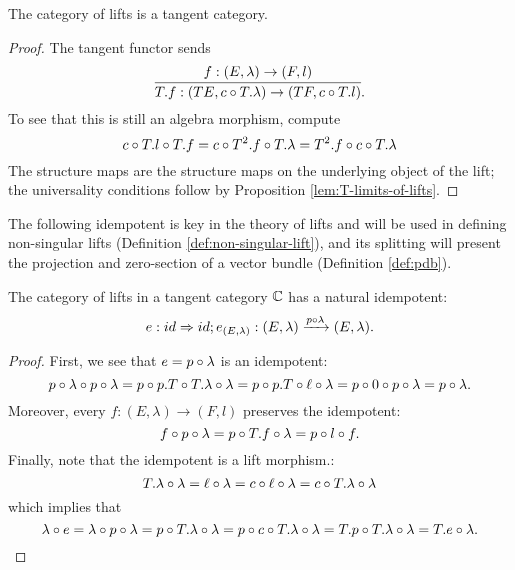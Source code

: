 \begin{proposition}\label{prop:lifts-is-tangent}
  The category of lifts is a tangent category.
\end{proposition}
\begin{proof}
  The tangent functor sends 
  \[
    \infer{T.f: (TE, c \o T.\lambda) \to (TF, c \o T.l)}{f:(E,\lambda) \to (F,l)}.
  \]
  To see that this is still an algebra morphism, compute
  \[
    c \circ T.l \circ T.f = c \circ T^2.f \circ T.\lambda = T^2.f \circ c \circ T.\lambda
  \]
  The structure maps are the structure maps on the underlying object of the lift; the universality conditions follow by Proposition \ref{lem:T-limits-of-lifts}.
\end{proof}

%   
%   

The following idempotent is key in the theory of lifts and will be used in defining non-singular lifts (Definition \ref{def:non-singular-lift}), and its splitting will present the projection and zero-section of a vector bundle (Definition \ref{def:pdb}).

\begin{proposition}%
  \label{prop:idempotent-natural}
  The category of lifts in a tangent category $\mathbb{C}$ has a natural idempotent:
  \[
      e: id \Rightarrow id; e_{(E,\lambda)}: (E,\lambda) \xrightarrow[]{p \circ \lambda} (E,\lambda).
  \]
\end{proposition}
\begin{proof}
  First, we see that $e = p \circ \lambda$ is an idempotent:
  \[ p \circ \lambda \circ p \circ \lambda
  = p\circ p.T \circ T.\lambda \circ \lambda \\
  = p\circ p.T \circ\ell\circ \lambda \\
  = p \circ 0 \circ p\circ \lambda \\
  = p \circ \lambda.\]
  Moreover, every $f:(E,\lambda) \to (F,l)$ preserves the idempotent:
  \[
    f \circ p \circ \lambda = p \circ T.f \circ \lambda = p \circ l \circ f.
  \]
  Finally, note that the idempotent is a lift morphism.:
  \[
    T.\lambda \circ \lambda = \ell \circ \lambda = c \circ \ell \circ \lambda = c \circ T.\lambda \circ \lambda
  \]
  which implies that 
  \[
    \lambda \circ e = \lambda \circ p \circ \lambda = p \circ T.\lambda \circ \lambda = p \circ c \circ T.\lambda \circ \lambda = T.p \circ T.\lambda \circ \lambda = T.e \circ \lambda.
  \]
\end{proof}

